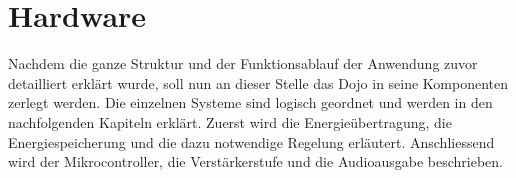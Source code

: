 \section{Hardware}\label{sec:hardware}

Nachdem die ganze Struktur und der Funktionsablauf der Anwendung zuvor detailliert erklärt wurde, soll nun an dieser Stelle das Dojo in seine Komponenten zerlegt werden. Die einzelnen Systeme sind logisch geordnet und werden in den nachfolgenden Kapiteln erklärt. Zuerst wird die Energieübertragung, die Energiespeicherung und die dazu notwendige Regelung erläutert. Anschliessend wird der Mikrocontroller, die Verstärkerstufe und die Audioausgabe beschrieben.